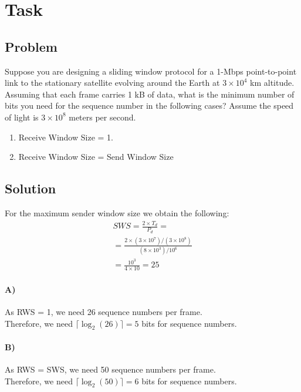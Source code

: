 \documentclass[12pt]{article}
\begin{document}
    \section{Task}\label{sec:task-3}
    \subsection{Problem}
        Suppose you are designing a sliding window protocol for a 1-Mbps point-to-point link to the
        stationary satellite evolving around the Earth at $3\times10^4$ km altitude.
        Assuming that each frame carries 1 kB of data,
        what is the minimum number of bits you need for the sequence number in the following cases?
        Assume the speed of light is $3\times10^8$ meters per second.

        \begin{enumerate}[label=(\alph*)]
            \item Receive Window Size = 1.
            \item Receive Window Size = Send Window Size
        \end{enumerate}

    \subsection{Solution}

        For the maximum sender window size we obtain the following:
            \begin{gather}
                SWS = \frac{2 \times T_d}{P_d} = \\
                = \frac{2 \times (3\times10^7)/(3\times10^8)}{(8\times10^3)/10^6} \\
                = \frac{10^3}{4\times10} = 25
            \end{gather}
        \paragraph{A)} As RWS = 1, we need 26 sequence numbers per frame.\\
                 Therefore, we need $\lceil \log_{2}(26) \rceil = 5$ bits for sequence numbers.
        \paragraph{B)} As RWS = SWS, we need 50 sequence numbers per frame.\\
                 Therefore, we need $\lceil \log_{2}(50) \rceil = 6$ bits for sequence numbers.
\end{document}
